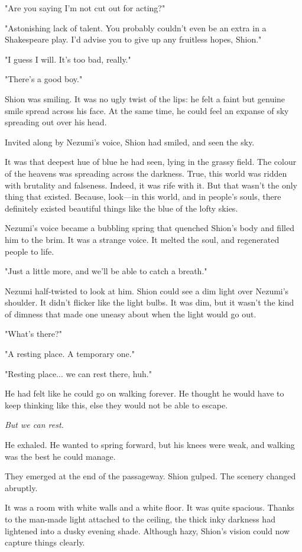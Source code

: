 "Are you saying I'm not cut out for acting?"

"Astonishing lack of talent. You probably couldn't even be an extra in a
Shakespeare play. I'd advise you to give up any fruitless hopes, Shion."

"I guess I will. It's too bad, really."

"There's a good boy."

Shion was smiling. It was no ugly twist of the lips: he felt a faint but
genuine smile spread across his face. At the same time, he could feel an
expanse of sky spreading out over his head.

Invited along by Nezumi's voice, Shion had smiled, and seen the sky.

It was that deepest hue of blue he had seen, lying in the grassy field.
The colour of the heavens was spreading across the darkness. True, this
world was ridden with brutality and falseness. Indeed, it was rife with
it. But that wasn't the only thing that existed. Because, look---in this
world, and in people's souls, there definitely existed beautiful things
like the blue of the lofty skies.

Nezumi's voice became a bubbling spring that quenched Shion's body and
filled him to the brim. It was a strange voice. It melted the soul, and
regenerated people to life.

"Just a little more, and we'll be able to catch a breath."

Nezumi half-twisted to look at him. Shion could see a dim light over
Nezumi's shoulder. It didn't flicker like the light bulbs. It was dim,
but it wasn't the kind of dimness that made one uneasy about when the
light would go out.

"What's there?"

"A resting place. A temporary one."

"Resting place... we can rest there, huh."

He had felt like he could go on walking forever. He thought he would
have to keep thinking like this, else they would not be able to escape.

\emph{But we can rest.}

He exhaled. He wanted to spring forward, but his knees were weak, and
walking was the best he could manage.

They emerged at the end of the passageway. Shion gulped. The scenery
changed abruptly.

It was a room with white walls and a white floor. It was quite spacious.
Thanks to the man-made light attached to the ceiling, the thick inky
darkness had lightened into a dusky evening shade. Although hazy,
Shion's vision could now capture things clearly.

